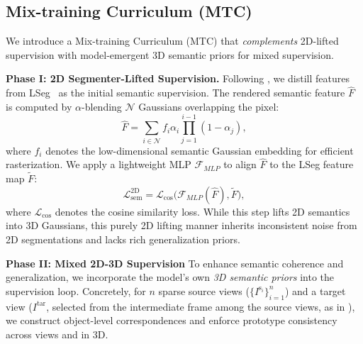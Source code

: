 \documentclass[runningheads]{llncs}
\begin{document}
\subsection{Mix-training Curriculum (MTC)}  \label{sec:MTC}
We introduce a Mix-training Curriculum (MTC) that \emph{complements} 2D-lifted supervision with model-emergent 3D semantic priors for mixed supervision. 


\noindent
\textbf{Phase I: 2D Segmenter-Lifted Supervision.}
Following \cite{lsm,uni3r}, we distill features from LSeg~\cite{LSeg} as the initial semantic supervision. 
The rendered semantic feature $\hat{{F}}$ is computed by $\alpha$-blending $\mathcal{N}$ Gaussians overlapping the pixel: 
\begin{equation} 
\hat{{F}} = \sum_{i \in \mathcal{N}} {{f}}_i \alpha_i \prod_{j=1}^{i-1} (1 - \alpha_j), 
\label{eq_alphablending_sem}
\end{equation} 
where ${{f}}_i$ denotes the low-dimensional semantic Gaussian embedding for efficient rasterization.  
We apply a lightweight MLP $\mathcal{F}_{MLP}$ to align $\hat{{F}}$ to the LSeg feature map $\tilde{F}$: 
\begin{equation}
\mathcal{L}_{\text{sem}}^{\text{2D}} = \mathcal{L}_{\cos} \big(\mathcal{F}_{MLP}(\hat{{{F}}}), \tilde{F} \big), 
\label{lseg_cos_loss}  
\end{equation} 
where $\mathcal{L}_{\cos}$ denotes the cosine similarity loss. 
While this step lifts 2D semantics into 3D Gaussians, this purely 2D lifting manner inherits inconsistent noise from 2D segmentations and lacks rich generalization priors. 





\noindent
\textbf{Phase II: Mixed 2D-3D Supervision }   
To enhance semantic coherence and generalization, we incorporate the model’s own \textit{3D semantic priors} into the supervision loop. 
Concretely, for $n$ sparse source views ($\{I^{\text{s}_i}\}_{i=1}^{n}$) and a target view ($I^{\text{tar}}$, selected from the intermediate frame among the source views, as in \cite{lsm,uni3r}), we construct object-level correspondences and enforce prototype consistency across views and in 3D.
\end{document}
